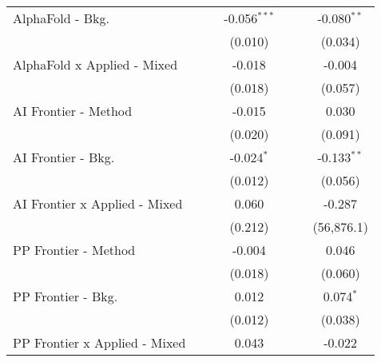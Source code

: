 \begin{tabular}{lcccccc}
   AlphaFold - Bkg.              &                &                & -0.056$^{***}$ &                &                & -0.080$^{**}$\\   
                                 &                &                & (0.010)        &                &                & (0.034)\\   
   AlphaFold x Applied - Mixed   &                &                & -0.018         &                &                & -0.004\\   
                                 &                &                & (0.018)        &                &                & (0.057)\\   
   AI Frontier - Method          &                &                & -0.015         &                &                & 0.030\\   
                                 &                &                & (0.020)        &                &                & (0.091)\\   
   AI Frontier - Bkg.            &                &                & -0.024$^{*}$   &                &                & -0.133$^{**}$\\   
                                 &                &                & (0.012)        &                &                & (0.056)\\   
   AI Frontier x Applied - Mixed &                &                & 0.060          &                &                & -0.287\\   
                                 &                &                & (0.212)        &                &                & (56,876.1)\\   
   PP Frontier - Method          &                &                & -0.004         &                &                & 0.046\\   
                                 &                &                & (0.018)        &                &                & (0.060)\\   
   PP Frontier - Bkg.            &                &                & 0.012          &                &                & 0.074$^{*}$\\   
                                 &                &                & (0.012)        &                &                & (0.038)\\   
   PP Frontier x Applied - Mixed &                &                & 0.043          &                &                & -0.022\\   

\end{tabular}
